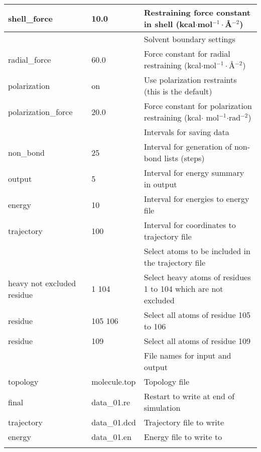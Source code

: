 \documentclass[a4paper,10pt]{article}
\begin{document}
\begin{longtable}{|p{105pt} p{60pt}|p{235pt}|}
  \hline shell{\_}force           & 10.0         & Restraining force constant in shell (kcal$\cdot $mol$^{-1}\cdot ${\AA}$^{-2}$) \\
  \hline [solvent]                &              & Solvent boundary settings \\
  \hline radial{\_}force          & 60.0         & Force constant for radial restraining (kcal$\cdot $mol$^{-1}\cdot ${\AA}$^{-2}$) \\
  \hline polarization             & on           & Use polarization restraints (this is the default) \\
  \hline polarization{\_}force    & 20.0         & Force constant for polarization restraining (kcal$\cdot$ mol$^{-1}$$\cdot$rad$^{-2}$) \\
  \hline [intervals]              &              & Intervals for saving data \\
  \hline non{\_}bond              & 25           & Interval for generation of non-bond lists (steps) \\
  \hline output                   & 5            & Interval for energy summary in output \\
  \hline energy                   & 10           & Interval for energies to energy file \\
  \hline trajectory               & 100          & Interval for coordinates to trajectory file \\
  \hline [trajectory{\_}atoms]    &              & Select atoms to be included in the trajectory file \\
  \hline heavy not excluded residue & 1 104      & Select heavy atoms of residues 1 to 104 which are not excluded \\
  \hline residue                  & 105 106      & Select all atoms of residue 105 to 106 \\
  \hline residue                  & 109          & Select all atoms of residue 109 \\
  \hline [files]                  &              & File names for input and output \\
  \hline topology                 & molecule.top    & Topology file \\
  \hline final                    & data{\_}01.re   & Restart to write at end of simulation \\
  \hline trajectory               & data{\_}01.dcd  & Trajectory file to write \\
  \hline energy                   & data{\_}01.en   & Energy file to write to \\
$$
\end{longtable}
\end{document}
